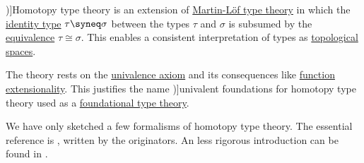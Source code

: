 \begin{definition}\label{def:homotopy_type_theory}\mimprovised
  \term[en=homotopy type theory (\cite[1]{UnivalentFoundationsProgram2013HoTT})]{Homotopy type theory} is an extension of \hyperref[def:martin_lof_type_theory]{Martin-L\"of type theory} in which the \hyperref[def:identity_type]{identity type} \( \tau \syneq \sigma \) between the types \( \tau \) and \( \sigma \) is subsumed by the \hyperref[def:equivalence_of_types]{equivalence} \( \tau \cong \sigma \). This enables a consistent interpretation of types as \hyperref[def:topological_space]{topological spaces}.

  The theory rests on the \hyperref[def:univalence_axiom]{univalence axiom} and its consequences like \hyperref[def:function_extensionality_axiom]{function extensionality}. This justifies the name \term[en=univalent foundations (\cite[1]{UnivalentFoundationsProgram2013HoTT})]{univalent foundations} for homotopy type theory used as a \hyperref[con:foundational_theory/types]{foundational type theory}.
\end{definition}
\begin{comments}
  \item We have only sketched a few formalisms of homotopy type theory. The essential reference is \cite{UnivalentFoundationsProgram2013HoTT}, written by the originators. An less rigorous introduction can be found in \cite[ch. 9]{Mimram2020ProgramEqualsProof}.
\end{comments}
